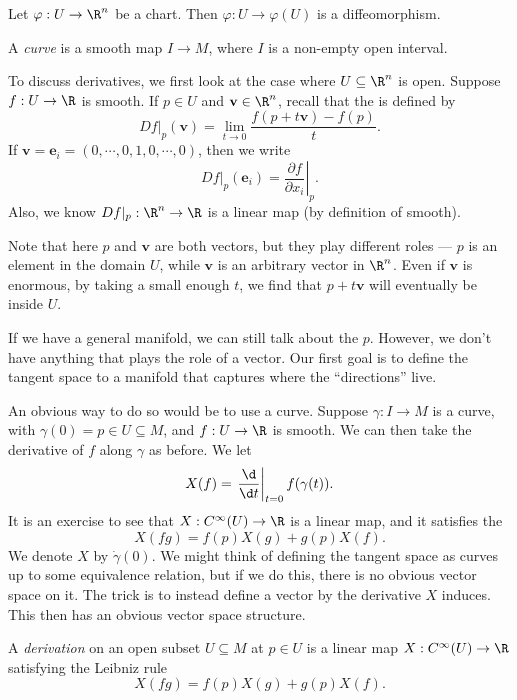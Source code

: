 \documentclass[a4paper]{article}
\begin{document}
\begin{eg}
  Let $\varphi: U \to \R^n$ be a chart. Then $\varphi: U \to \varphi(U)$ is a diffeomorphism.
\end{eg}

\begin{defi}[Curve]
  A \emph{curve} is a smooth map $I \to M$, where $I$ is a non-empty open interval.
\end{defi}

To discuss derivatives, we first look at the case where $U \subseteq \R^n$ is open. Suppose $f: U \to \R$ is smooth. If $p \in U$ and $\mathbf{v} \in \R^n$, recall that the  is defined by
\[
  Df|_p(\mathbf{v}) = \lim_{t \to 0} \frac{f(p + t\mathbf{v}) - f(p)}{t}.
\]
If $\mathbf{v} = \mathbf{e}_i = (0, \cdots, 0, 1, 0, \cdots, 0)$, then we write
\[
  Df|_p (\mathbf{e}_i) = \left.\frac{\partial f}{\partial x_i}\right|_p.
\]
Also, we know $Df|_p: \R^n \to \R$ is a linear map (by definition of smooth).

Note that here $p$ and $\mathbf{v}$ are both vectors, but they play different roles --- $p$ is an element in the domain $U$, while $\mathbf{v}$ is an arbitrary vector in $\R^n$. Even if $\mathbf{v}$ is enormous, by taking a small enough $t$, we find that $p + t\mathbf{v}$ will eventually be inside $U$.

If we have a general manifold, we can still talk about the $p$. However, we don't have anything that plays the role of a vector. Our first goal is to define the tangent space to a manifold that captures where the ``directions'' live.

An obvious way to do so would be to use a curve. Suppose $\gamma: I \to M$ is a curve, with $\gamma(0) = p \in U \subseteq M$, and $f: U \to \R$ is smooth. We can then take the derivative of $f$ along $\gamma$ as before. We let
\[
  X(f) = \left.\frac{\d}{\d t}\right|_{t = 0} f(\gamma(t)).
\]
It is an exercise to see that $X: C^\infty(U) \to \R$ is a linear map, and it satisfies the 
\[
  X(fg) = f(p) X(g) + g(p) X(f).
\]
We denote $X$ by $\dot{\gamma}(0)$. We might think of defining the tangent space as curves up to some equivalence relation, but if we do this, there is no obvious vector space on it. The trick is to instead define a vector by the derivative $X$ induces. This then has an obvious vector space structure.
\begin{defi}[Derivation]
  A \emph{derivation} on an open subset $U \subseteq M$ at $p \in U$ is a linear map $X: C^\infty(U) \to \R$ satisfying the Leibniz rule
  \[
    X(fg) = f(p) X(g) + g(p) X(f).
  \]
\end{defi}
\end{document}
